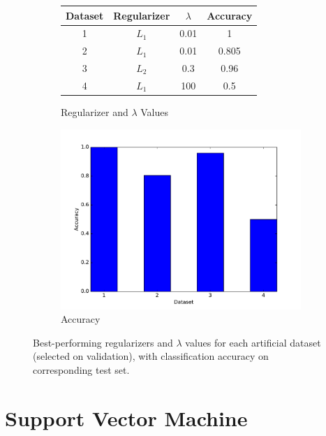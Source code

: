 \documentclass[10pt,psamsfonts]{amsart}
\theoremstyle{definition}
\theoremstyle{remark}
\numberwithin{equation}{section}
\begin{document}
\begin{figure}
	\centering
	\begin{subfigure}[b]{0.4\textwidth}
		\centering
		\begin{tabular}{c|c|c|c}\hline
			Dataset & Regularizer & $\lambda$ & Accuracy\\\hline
			1 & $L_1$ & 0.01 & 1 \\
			2 & $L_1$ & 0.01 & 0.805\\
			3 & $L_2$ & 0.3& 0.96  \\
			4 & $L_1$ & 100& 0.5 \\\hline
		\end{tabular}
		\caption{Regularizer and $\lambda$ Values}
	\end{subfigure}
	\begin{subfigure}[b]{0.2\textwidth}
		\includegraphics[width=\textwidth]{hw2_1-3_1.pdf}
		\caption{Accuracy}
	\end{subfigure}
	\caption{Best-performing regularizers and $\lambda$ values for each artificial dataset (selected on validation), with classification accuracy on corresponding test set.}
\end{figure}

\section{Support Vector Machine}
\end{document}
